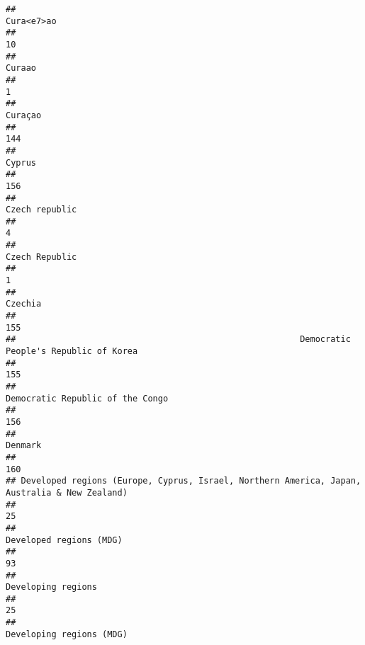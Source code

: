 \documentclass[]{article}
\begin{document}
\begin{verbatim}
##                                                                                   Cura<e7>ao 
##                                                                                           10 
##                                                                                      Curaao 
##                                                                                            1 
##                                                                                      Curaçao 
##                                                                                          144 
##                                                                                       Cyprus 
##                                                                                          156 
##                                                                               Czech republic 
##                                                                                            4 
##                                                                               Czech Republic 
##                                                                                            1 
##                                                                                      Czechia 
##                                                                                          155 
##                                                        Democratic People's Republic of Korea 
##                                                                                          155 
##                                                             Democratic Republic of the Congo 
##                                                                                          156 
##                                                                                      Denmark 
##                                                                                          160 
## Developed regions (Europe, Cyprus, Israel, Northern America, Japan, Australia & New Zealand) 
##                                                                                           25 
##                                                                      Developed regions (MDG) 
##                                                                                           93 
##                                                                           Developing regions 
##                                                                                           25 
##                                                                     Developing regions (MDG) 

\end{verbatim}
\end{document}
